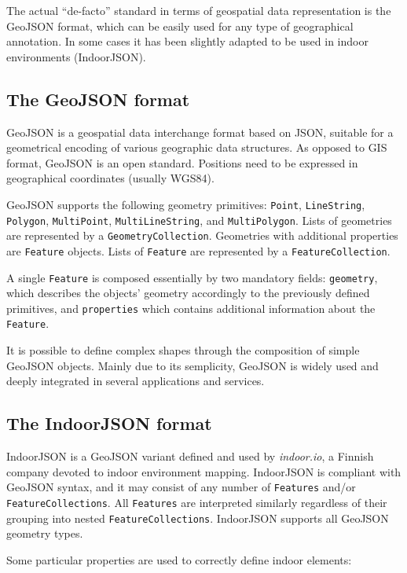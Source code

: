 \documentclass{sig-alternate}
\begin{document}
The actual ``de-facto'' standard in terms of geospatial data representation is
the GeoJSON format, which can be easily used for any type of geographical
annotation. In some cases it has been slightly adapted to be used in indoor
environments (IndoorJSON).

\subsection{The GeoJSON format}\label{the-geojson-format}

GeoJSON is a geospatial data interchange format based on JSON, suitable for a
geometrical encoding of various geographic data structures. As opposed to GIS
format, GeoJSON is an open standard. Positions need to be expressed in
geographical coordinates (usually WGS84).

GeoJSON supports the following geometry primitives: \texttt{Point},
\texttt{LineString}, \texttt{Polygon}, \texttt{MultiPoint},
\texttt{MultiLineString}, and \texttt{MultiPolygon}. Lists of geometries are
represented by a \texttt{GeometryCollection}. Geometries with additional
properties are \texttt{Feature} objects. Lists of \texttt{Feature} are
represented by a \texttt{FeatureCollection}.

A single \texttt{Feature} is composed essentially by two mandatory fields:
\texttt{geometry}, which describes the objects' geometry accordingly to the
previously defined primitives, and \texttt{properties} which contains
additional  information about the \texttt{Feature}.

It is possible to define complex shapes through the composition of simple
GeoJSON objects. Mainly due to its semplicity, GeoJSON is widely used and
deeply integrated in several applications and services.

\subsection{The IndoorJSON format}\label{experiences-on-indoor-json}

IndoorJSON is a GeoJSON variant defined and used by \emph{indoor.io}, a
Finnish company devoted to indoor environment mapping. IndoorJSON is compliant
with GeoJSON syntax, and it may consist of any number of \texttt{Features}
and/or \texttt{FeatureCollections}. All \texttt{Features} are interpreted
similarly regardless of their grouping into nested
\texttt{FeatureCollections}. IndoorJSON supports all GeoJSON geometry types.

Some particular properties are used to correctly define indoor elements:
\end{document}
